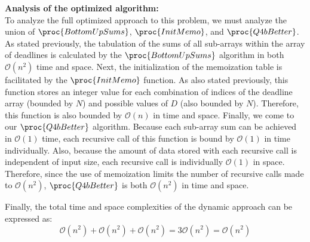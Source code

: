 \textbf{Analysis of the optimized algorithm:}\\
To analyze the full optimized approach to this problem, we must analyze the union of $\proc{BottomUpSums}$, $\proc{InitMemo}$, and $\proc{Q4bBetter}$.
As stated previously, the tabulation of the sums of all sub-arrays within the array of deadlines is calculated by the $\proc{BottomUpSums}$ algorithm in both $\mathcal{O}(n^2)$ time and space.
Next, the initialization of the memoization table is facilitated by the $\proc{InitMemo}$ function.
As also stated previously, this function stores an integer value for each combination of indices of the deadline array (bounded by $N$) and possible values of $D$ (also bounded by $N$).
Therefore, this function is also bounded by $\mathcal{O}(n)$ in time and space.
Finally, we come to our $\proc{Q4bBetter}$ algorithm.
Because each sub-array sum can be achieved in $\mathcal{O}(1)$ time, each recursive call of this function is bound by $\mathcal{O}(1)$ in time individually.
Also, because the amount of data stored with each recursive call is independent of input size, each recursive call is individually $\mathcal{O}(1)$ in space.
Therefore, since the use of memoization limits the number of recursive calls made to $\mathcal{O}(n^2)$, $\proc{Q4bBetter}$ is both $\mathcal{O}(n^2)$ in time and space.

Finally, the total time and space complexities of the dynamic approach can be expressed as:
\[\mathcal{O}(n^2) + \mathcal{O}(n^2) + \mathcal{O}(n^2) = 3\mathcal{O}(n^2) = \mathcal{O}(n^2)\]


